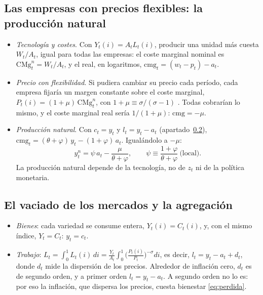 \documentclass[11pt]{article}
\begin{document}
\subsection{Las empresas con precios flexibles: la producción natural}\label{anexo:empresas}

\begin{itemize}
\item \emph{Tecnología y costes}. Con $Y_t(i)=A_tL_t(i)$, producir una unidad más cuesta $W_t/A_t$, igual para todas las empresas: el coste marginal nominal es $\mathrm{CMg}^n_t=W_t/A_t$, y el real, en logaritmos, $\mathrm{cmg}_t=(w_t-p_t)-a_t$.
\item \emph{Precio con flexibilidad}. Si pudiera cambiar su precio cada período, cada empresa fijaría un margen constante sobre el coste marginal, $P_t(i)=(1+\mu)\,\mathrm{CMg}^n_t$, con $1+\mu\equiv\sigma/(\sigma-1)$ . Todas cobrarían lo mismo, y el coste marginal real sería $1/(1+\mu)$: $\mathrm{cmg}=-\mu$.
\item \emph{Producción natural}. Con $c_t=y_t$ y $l_t=y_t-a_t$ (apartado~\ref{anexo:agregacion}), $\mathrm{cmg}_t=(\theta+\varphi)\,y_t-(1+\varphi)\,a_t$. Igualándolo a $-\mu$:
  \begin{equation}
  y^n_t=\psi\,a_t-\frac{\mu}{\theta+\varphi},\qquad \psi\equiv\frac{1+\varphi}{\theta+\varphi}\ \text{(local)}. \label{eq:anexo-natural}
  \end{equation}
  La producción natural depende de la tecnología, no de $z_t$ ni de la política monetaria.
\end{itemize}

\subsection{El vaciado de los mercados y la agregación}\label{anexo:agregacion}

\begin{itemize}
\item \emph{Bienes}: cada variedad se consume entera, $Y_t(i)=C_t(i)$, y, con el mismo índice, $Y_t=C_t$: $y_t=c_t$.
\item \emph{Trabajo}: $L_t=\int_0^1L_t(i)\,di=\frac{Y_t}{A_t}\int_0^1\Big(\frac{P_t(i)}{P_t}\Big)^{-\sigma}di$, es decir, $l_t=y_t-a_t+d_t$, donde $d_t$ mide la dispersión de los precios. Alrededor de inflación cero, $d_t$ es de segundo orden, y a primer orden $l_t=y_t-a_t$. A segundo orden no lo es: por eso la inflación, que dispersa los precios, cuesta bienestar \eqref{eq:perdida}.
\end{itemize}
\end{document}

